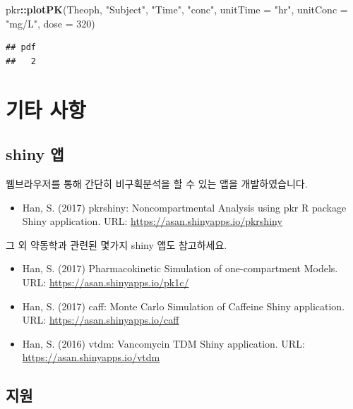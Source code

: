 \documentclass[12pt,]{krantz}
\newenvironment{Shaded}{\begin{snugshade}}{\end{snugshade}}
\newcommand{\KeywordTok}[1]{\textcolor[rgb]{0.13,0.29,0.53}{\textbf{#1}}}
\newcommand{\DataTypeTok}[1]{\textcolor[rgb]{0.13,0.29,0.53}{#1}}
\newcommand{\DecValTok}[1]{\textcolor[rgb]{0.00,0.00,0.81}{#1}}
\newcommand{\StringTok}[1]{\textcolor[rgb]{0.31,0.60,0.02}{#1}}
\newcommand{\OperatorTok}[1]{\textcolor[rgb]{0.81,0.36,0.00}{\textbf{#1}}}
\newcommand{\NormalTok}[1]{#1}
\providecommand{\tightlist}{%
  \setlength{\itemsep}{0pt}\setlength{\parskip}{0pt}}
\begin{document}
\begin{Shaded}
\begin{Highlighting}[]
\NormalTok{pkr}\OperatorTok{::}\KeywordTok{plotPK}\NormalTok{(Theoph, }\StringTok{"Subject"}\NormalTok{, }\StringTok{"Time"}\NormalTok{, }\StringTok{"conc"}\NormalTok{, }
            \DataTypeTok{unitTime =} \StringTok{"hr"}\NormalTok{, }\DataTypeTok{unitConc =} \StringTok{"mg/L"}\NormalTok{, }\DataTypeTok{dose =} \DecValTok{320}\NormalTok{)}
\end{Highlighting}
\end{Shaded}

\begin{verbatim}
## pdf 
##   2
\end{verbatim}

\chapter{기타 사항}\label{-}

\section{shiny 앱}\label{shiny-}

웹브라우저를 통해 간단히 비구획분석을 할 수 있는 앱을 개발하였습니다.

\begin{itemize}
\tightlist
\item
  Han, S. (2017) pkrshiny: Noncompartmental Analysis using pkr R package
  Shiny application. URL: \url{https://asan.shinyapps.io/pkrshiny}
\end{itemize}

그 외 약동학과 관련된 몇가지 shiny 앱도 참고하세요.

\begin{itemize}
\tightlist
\item
  Han, S. (2017) Pharmacokinetic Simulation of one-compartment Models.
  URL: \url{https://asan.shinyapps.io/pk1c/}
\item
  Han, S. (2017) caff: Monte Carlo Simulation of Caffeine Shiny
  application. URL: \url{https://asan.shinyapps.io/caff}
\item
  Han, S. (2016) vtdm: Vancomycin TDM Shiny application. URL:
  \url{https://asan.shinyapps.io/vtdm}
\end{itemize}

\section{지원}
\end{document}
